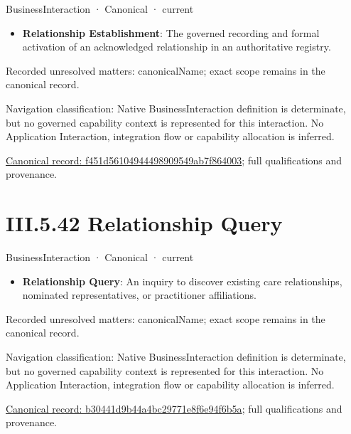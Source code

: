 \label{element:f451d56104944498909549ab7f864003}
{\small BusinessInteraction · Canonical · current}\par

\begin{itemize}


\item \textbf{Relationship Establishment}: The governed recording and formal activation of an acknowledged relationship in an authoritative registry.

\end{itemize}

{\small Recorded unresolved matters: canonicalName; exact scope remains in the canonical record.}\par
{\small Navigation classification: Native BusinessInteraction definition is determinate, but no governed capability context is represented for this interaction. No Application Interaction, integration flow or capability allocation is inferred.}\par
{\footnotesize \href{../../../../continuum/business/business-interaction/f451d56104944498909549ab7f864003.md}{Canonical record: f451d56104944498909549ab7f864003}; full qualifications and provenance.}\par
\section*{III.5.42 Relationship Query}
\label{navigation:III.5.42}

\label{element:b30441d9b44a4bc29771e8f6e94f6b5a}
{\small BusinessInteraction · Canonical · current}\par

\begin{itemize}


\item \textbf{Relationship Query}: An inquiry to discover existing care relationships, nominated representatives, or practitioner affiliations.

\end{itemize}

{\small Recorded unresolved matters: canonicalName; exact scope remains in the canonical record.}\par
{\small Navigation classification: Native BusinessInteraction definition is determinate, but no governed capability context is represented for this interaction. No Application Interaction, integration flow or capability allocation is inferred.}\par
{\footnotesize \href{../../../../continuum/business/business-interaction/b30441d9b44a4bc29771e8f6e94f6b5a.md}{Canonical record: b30441d9b44a4bc29771e8f6e94f6b5a}; full qualifications and provenance.}\par

